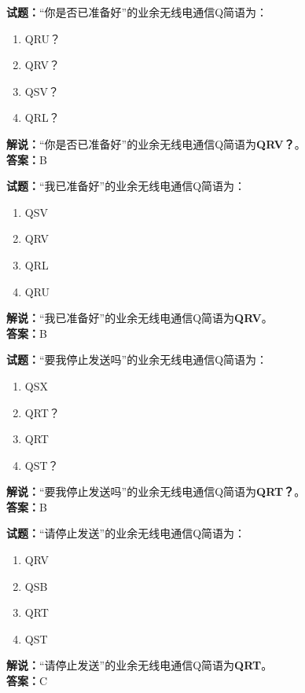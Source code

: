 \documentclass{ctexbook}
\begin{document}
\bigskip


\noindent\textbf{试题：}“你是否已准备好”的业余无线电通信Q简语为：
\begin{enumerate}[leftmargin=3em]
\item QRU？
\item QRV？
\item QSV？
\item QRL？
\end{enumerate}
\noindent\textbf{解说：}“你是否已准备好”的业余无线电通信Q简语为\textbf{QRV？}。\\\noindent\textbf{答案：}B




\bigskip


\noindent\textbf{试题：}“我已准备好”的业余无线电通信Q简语为：
\begin{enumerate}[leftmargin=3em]
\item QSV
\item QRV
\item QRL
\item QRU
\end{enumerate}
\noindent\textbf{解说：}“我已准备好”的业余无线电通信Q简语为\textbf{QRV}。\\\noindent\textbf{答案：}B



\bigskip


\noindent\textbf{试题：}“要我停止发送吗”的业余无线电通信Q简语为：
\begin{enumerate}[leftmargin=3em]
\item QSX
\item QRT？
\item QRT
\item QST？
\end{enumerate}
\noindent\textbf{解说：}“要我停止发送吗”的业余无线电通信Q简语为\textbf{QRT？}。\\\noindent\textbf{答案：}B



\bigskip


\noindent\textbf{试题：}“请停止发送”的业余无线电通信Q简语为：
\begin{enumerate}[leftmargin=3em]
\item QRV
\item QSB
\item QRT
\item QST
\end{enumerate}
\noindent\textbf{解说：}“请停止发送”的业余无线电通信Q简语为\textbf{QRT}。\\\noindent\textbf{答案：}C
\end{document}

